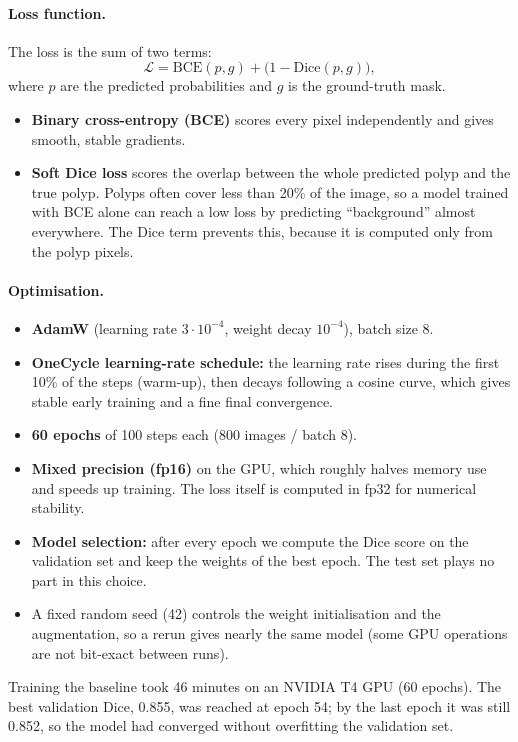 \paragraph{Loss function.}
The loss is the sum of two terms:
\begin{equation}
  \mathcal{L} = \mathrm{BCE}(p, g) + \bigl(1 - \mathrm{Dice}(p, g)\bigr),
  \label{eq:loss}
\end{equation}
where $p$ are the predicted probabilities and $g$ is the ground-truth mask.
\begin{itemize}
  \item \textbf{Binary cross-entropy (BCE)} scores every pixel independently and gives smooth, stable gradients.
  \item \textbf{Soft Dice loss} scores the overlap between the whole predicted polyp and the true polyp. Polyps often
        cover less than 20\% of the image, so a model trained with BCE alone can reach a low loss by predicting
        ``background'' almost everywhere. The Dice term prevents this, because it is computed only from the polyp
        pixels.
\end{itemize}

\paragraph{Optimisation.}
\begin{itemize}
  \item \textbf{AdamW} (learning rate $3\cdot10^{-4}$, weight decay $10^{-4}$), batch size 8.
  \item \textbf{OneCycle learning-rate schedule:} the learning rate rises during the first 10\% of the steps (warm-up),
        then decays following a cosine curve, which gives stable early training and a fine final convergence.
  \item \textbf{60 epochs} of 100 steps each (800 images / batch 8).
  \item \textbf{Mixed precision (fp16)} on the GPU, which roughly halves memory use and speeds up training.
        The loss itself is computed in fp32 for numerical stability.
  \item \textbf{Model selection:} after every epoch we compute the Dice score on the validation set and keep the weights
        of the best epoch. The test set plays no part in this choice.
  \item A fixed random seed (42) controls the weight initialisation and the augmentation, so a rerun gives
        nearly the same model (some GPU operations are not bit-exact between runs).
\end{itemize}
Training the baseline took 46 minutes on an NVIDIA T4 GPU (60 epochs). The best validation Dice, 0.855,
was reached at epoch 54; by the last epoch it was still 0.852, so the model had converged without
overfitting the validation set.


